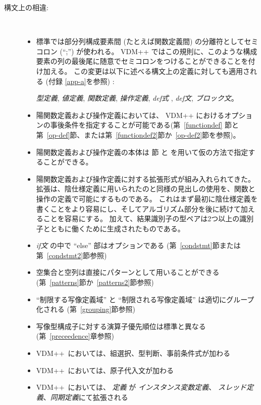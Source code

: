 \documentclass[\pformat,12pt]{jarticle}
\newcommand{\vdmslpp}[2]{%
#2
}
\newcommand{\vdmsl}{VDM-SL}
\newcommand{\vdmpp}{VDM++}
\begin{document}
\begin{description}
\item[構文上の相違:]\mbox{}\\
  \begin{itemize}
  
  \item 標準では部分列構成要素間 (たとえば関数定義間) の分離符としてセミコロン (``;'') が使われる。
  \vdmslpp{\vdmsl}{\vdmpp} ではこの規則に、このような構成要素の列の最後尾に随意でセミコロンをつけることができることを付け加える。
この変更は以下に述べる構文上の定義に対しても適用される (付録 \ref{app-a}を参照)
: \vdmslpp{{\em 状態定義},}{} {\em 型定義}, {\em 値定義},
    {\em 関数定義}, {\em 操作定義}, {\em def式
    }, {\em def文}, {\em ブロック文}。

  \item 陽関数定義および操作定義においては、 \vdmslpp{VDM-SL}{\vdmpp} におけるオプションの事後条件を指定することが可能である(第~\ref{functiondef} 節と第~\ref{op-def}節、または第~\ref{functiondef2}節か~\ref{op-def2}節を参照)。

  \item 陽関数定義および操作定義の本体は \vdmslpp{節}{節
    と}を用いて仮の方法で指定することができる。

    
  \item 陽関数定義および操作定義に対する拡張形式が組み入れられてきた。
拡張は、陰仕様定義に用いられたのと同様の見出しの使用を、関数と操作の定義で可能にするものである。
これはまず最初に陰仕様定義を書くことをより容易にし、そしてアルゴリズム部分を後に続けて加えることを容易にする。 
加えて、結果識別子の型ペアは2つ以上の識別子とともに働くために生成されたものである。


  \item  {\it if文\/} の中で ``else'' 部はオプションである (第~\ref{condstmt}節または第~\ref{condstmt2}節参照)
        
  \item 空集合と空列は直接にパターンとして用いることができる (第~\ref{patterns}節か~\ref{patterns2}節参照)
  \item ``制限する写像定義域'' と ``制限される写像定義域'' は適切にグループ化される (第~\ref{grouping}節参照)
  \item 写像型構成子に対する演算子優先順位は標準と異なる (第~\ref{preceedence}章参照)
  \item \vdmpp\ においては、組選択、型判断、事前条件式が加わる
  \item \vdmpp\ においては、原子代入文が加わる
  \item  \vdmpp\ においては、 {\em 定義} が  {\em インスタンス変数定義}、
   {\em スレッド定義}、{\em 同期定義}にて拡張される


\end{itemize}
\end{description}
\end{document}
